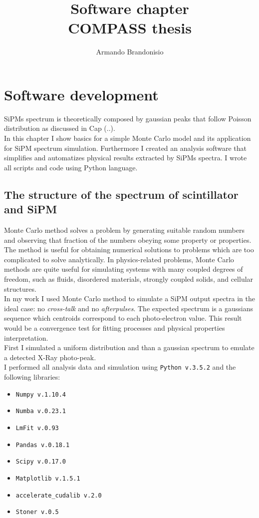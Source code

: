\documentclass[10pt,a4paper, openany]{book}
\author{Armando Brandonisio}
\title{\textbf{Software chapter}\\COMPASS thesis}
\begin{document}
\maketitle
\tableofcontents \newpage

\chapter{Software development}
SiPMs spectrum is theoretically composed by gaussian peaks that follow Poisson distribution as discussed in Cap (..).\\
In this chapter I show basics for a simple Monte Carlo model and its application for SiPM spectrum simulation. Furthermore I created an analysis software that simplifies and automatizes physical results extracted by SiPMs spectra. I wrote all scripts and code using Python language. 

\section{The structure of the spectrum of scintillator and SiPM}
Monte Carlo method solves a problem by generating suitable random numbers and observing that fraction of the numbers obeying some property or properties. The method is useful for obtaining numerical solutions to problems which are too complicated to solve analytically. In physics-related problems, Monte Carlo methods are quite useful for simulating systems with many coupled degrees of freedom, such as fluids, disordered materials, strongly coupled solids, and cellular structures.\\
In my work I used Monte Carlo method to simulate a SiPM output spectra in the ideal case: no \emph{cross-talk} and no \emph{afterpulses}. The expected spectrum is a gaussians sequence  which centroids correspond to each photo-electron value. This result would be a convergence test for fitting processes and physical properties interpretation.\\
First I simulated a uniform distribution and than a gaussian spectrum to emulate a detected X-Ray photo-peak.\\
I performed all analysis data and simulation using \verb|Python v.3.5.2| and the following libraries:
\begin{itemize}
\item \verb|Numpy v.1.10.4|
\item \verb|Numba v.0.23.1|
\item \verb|LmFit v.0.93|
\item \verb|Pandas v.0.18.1|
\item \verb|Scipy v.0.17.0|
\item \verb|Matplotlib v.1.5.1|
\item \verb|accelerate_cudalib v.2.0|
\item \verb|Stoner v.0.5|

\end{itemize}
\end{document}
